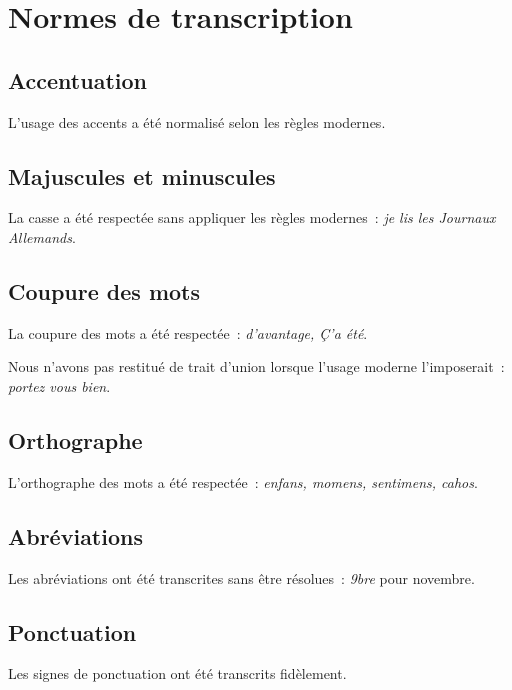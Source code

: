 \documentclass[a4paper,12pt,twoside]{book}
\begin{document}
	\appendix
	
	\renewcommand{\appendixpagename}{Annexes}
	
	\renewcommand{\appendixtocname}{Annexes}
	
	\addappheadtotoc%
	
	\appendixpage %
	\chapter{Normes de transcription}
	
		\section{Accentuation}
		L'usage des accents a été normalisé selon les règles modernes.
		
		\section{Majuscules et minuscules}
		La casse a été respectée sans appliquer les règles modernes~: \textit{je lis les Journaux Allemands}.
		
		\section{Coupure des mots}
		La coupure des mots a été respectée~: \textit{d'avantage, Ç'a été}.
		
		Nous n'avons pas restitué de trait d'union lorsque l'usage moderne l'imposerait~: \textit{portez vous bien}.
				
		\section{Orthographe}
		L'orthographe des mots a été respectée~: \textit{enfans, momens, sentimens, cahos}.
		
		\section{Abréviations}
		Les abréviations ont été transcrites sans être résolues~: \textit{9bre} pour novembre.

		\section{Ponctuation}
		Les signes de ponctuation ont été transcrits fidèlement.
		
\end{document}
